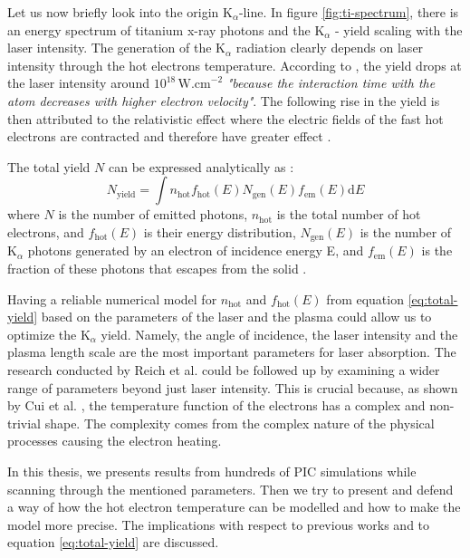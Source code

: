 Let us now briefly look into the origin $\mathrm{K}_\alpha$-line. In figure \ref{fig:ti-spectrum}, there is an energy spectrum of titanium x-ray photons and the $\mathrm{K}_\alpha$ - yield scaling with the laser intensity. The generation of the $\mathrm{K}_\alpha$ radiation clearly depends on laser intensity through the hot electrons temperature. According to \cite{schwoerer2004}, the yield drops at the laser intensity around $10^{18}\,\mathrm{W.cm}^{-2}$ \textit{"because the interaction time with the atom decreases with higher electron velocity"}. The following rise in the yield is then attributed to the relativistic effect where the electric fields of the fast hot electrons are contracted and therefore have greater effect \cite{schwoerer2004}.

The total yield $N$ can be expressed analytically as \cite{reich2000}:
\begin{equation}
	N_{\mathrm{yield}} = \int n_\mathrm{hot} f_\mathrm{hot}(E) N_\mathrm{gen}(E) f_\mathrm{em}(E)\mathrm{d}E
	\label{eq:total-yield}
\end{equation}
where $N$ is the number of emitted photons, $n_\mathrm{hot}$ is the total number of hot electrons, and $f_\mathrm{hot}(E)$ is their energy distribution, $N_\mathrm{gen}(E)$ is the number of $\mathrm{K}_\alpha$ photons generated by an electron of incidence energy E, and $f_\mathrm{em}(E)$ is the fraction of these photons that escapes from the solid \cite{reich2000}. 

Having a reliable numerical model for $n_\mathrm{hot}$ and $f_\mathrm{hot}(E)$ from equation \ref{eq:total-yield} based on the parameters of the laser and the plasma could allow us to optimize the $\mathrm{K}_\alpha$ yield. Namely, the angle of incidence, the laser intensity and the plasma length scale are the most important parameters for laser absorption. The research conducted by Reich et al. \cite{reich2000} could be followed up by examining a wider range of parameters beyond just laser intensity. This is crucial because, as shown by Cui et al. \cite{cui2013}, the temperature function of the electrons has a complex and non-trivial shape. The complexity comes from the complex nature of the physical processes causing the electron heating.

In this thesis, we presents results from hundreds of PIC simulations while scanning through the mentioned parameters. Then we try to present and  defend a way of how the hot electron temperature can be modelled and how to make the model more precise. The implications with respect to previous works and to equation \ref{eq:total-yield} are discussed.

